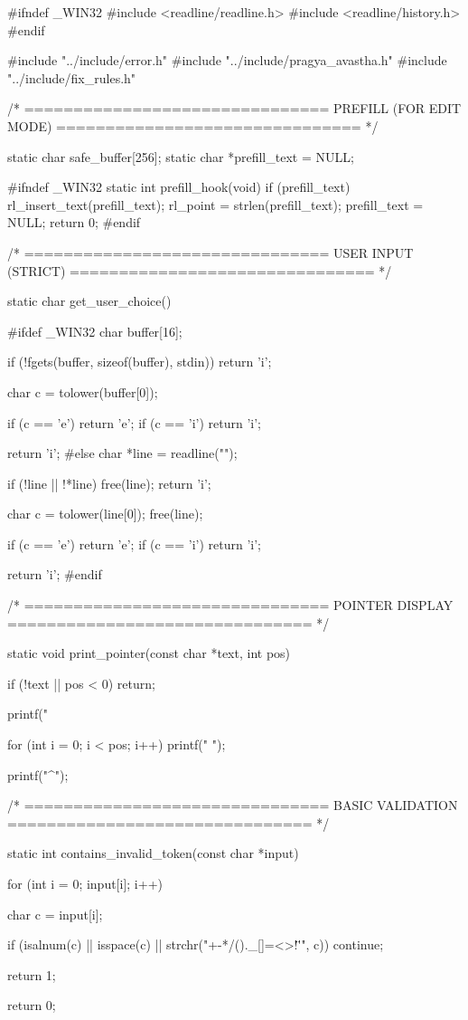 \documentclass{article}
\begin{document}
#ifndef _WIN32
#include <readline/readline.h>
#include <readline/history.h>
#endif

#include "../include/error.h"
#include "../include/pragya_avastha.h"
#include "../include/fix_rules.h"

/* ===============================
   PREFILL (FOR EDIT MODE)
   =============================== */

static char safe_buffer[256];
static char *prefill_text = NULL;

#ifndef _WIN32
static int prefill_hook(void)
{
    if (prefill_text)
    {
        rl_insert_text(prefill_text);
        rl_point = strlen(prefill_text);
        prefill_text = NULL;
    }
    return 0;
}
#endif

/* ===============================
   USER INPUT (STRICT)
   =============================== */

static char get_user_choice()
{
#ifdef _WIN32
    char buffer[16];

    if (!fgets(buffer, sizeof(buffer), stdin))
        return 'i';

    char c = tolower(buffer[0]);

    if (c == 'e') return 'e';
    if (c == 'i') return 'i';

    return 'i';
#else
    char *line = readline("");

    if (!line || !*line)
    {
        free(line);
        return 'i';
    }

    char c = tolower(line[0]);
    free(line);

    if (c == 'e') return 'e';
    if (c == 'i') return 'i';

    return 'i';
#endif
}

/* ===============================
   POINTER DISPLAY
   =============================== */

static void print_pointer(const char *text, int pos)
{
    if (!text || pos < 0) return;

    printf("%

    for (int i = 0; i < pos; i++)
        printf(" ");

    printf("^\n\n");
}

/* ===============================
   BASIC VALIDATION
   =============================== */

static int contains_invalid_token(const char *input)
{
    for (int i = 0; input[i]; i++)
    {
        char c = input[i];

        if (isalnum(c) || isspace(c) || strchr("+-*/()._{}[]=<>!\"'", c))
            continue;

        return 1;
    }
    return 0;
}
\end{document}
